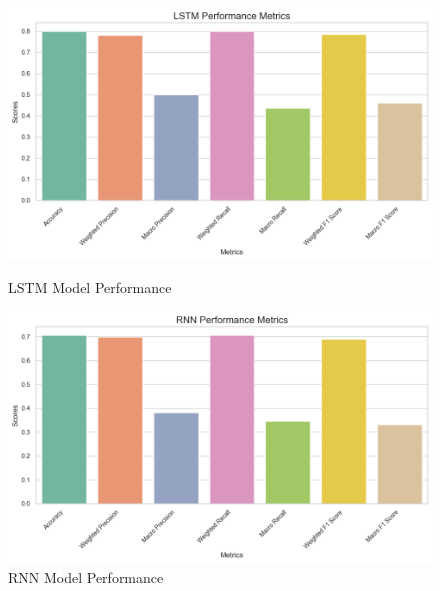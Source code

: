 \begin{figure}[H]
	\begin{minipage}{0.48\textwidth}
		\centering
		\includegraphics[width=\linewidth]{img/paper_2/LSTM.png}
		\caption{LSTM Model Performance}
		\label{fig:lstm_performance}
	\end{minipage}
	\hfill
	\begin{minipage}{0.48\textwidth}
		\centering
		\includegraphics[width=\linewidth]{img/paper_2/RNN.png}
		\caption{RNN Model Performance}
		\label{fig:rnn_performance}
	\end{minipage}
\end{figure}

